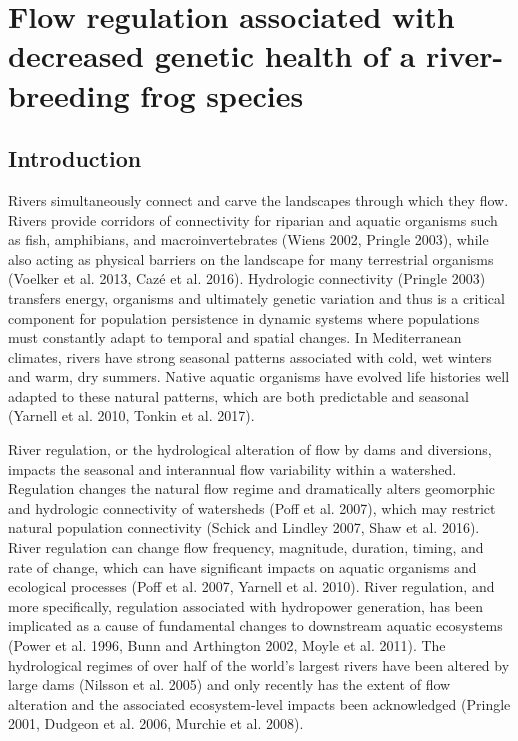 \documentclass[twoside,12pt,final]{ucthesis-CA2012} %
\begin{document}
\begin{ucmainmatter}

\pagestyle{plain}

\hypertarget{reg-health}{%
\chapter{Flow regulation associated with decreased genetic health of a
river-breeding frog species}\label{reg-health}}

\hypertarget{introduction}{%
\section{Introduction}\label{introduction}}

Rivers simultaneously connect and carve the landscapes through which
they flow. Rivers provide corridors of connectivity for riparian and
aquatic organisms such as fish, amphibians, and macroinvertebrates
(Wiens 2002, Pringle 2003), while also acting as physical barriers on
the landscape for many terrestrial organisms (Voelker et al. 2013, Cazé
et al. 2016). Hydrologic connectivity (Pringle 2003) transfers energy,
organisms and ultimately genetic variation and thus is a critical
component for population persistence in dynamic systems where
populations must constantly adapt to temporal and spatial changes. In
Mediterranean climates, rivers have strong seasonal patterns associated
with cold, wet winters and warm, dry summers. Native aquatic organisms
have evolved life histories well adapted to these natural patterns,
which are both predictable and seasonal (Yarnell et al. 2010, Tonkin et
al. 2017).

River regulation, or the hydrological alteration of flow by dams and
diversions, impacts the seasonal and interannual flow variability within
a watershed. Regulation changes the natural flow regime and dramatically
alters geomorphic and hydrologic connectivity of watersheds (Poff et al.
2007), which may restrict natural population connectivity (Schick and
Lindley 2007, Shaw et al. 2016). River regulation can change flow
frequency, magnitude, duration, timing, and rate of change, which can
have significant impacts on aquatic organisms and ecological processes
(Poff et al. 2007, Yarnell et al. 2010). River regulation, and more
specifically, regulation associated with hydropower generation, has been
implicated as a cause of fundamental changes to downstream aquatic
ecosystems (Power et al. 1996, Bunn and Arthington 2002, Moyle et al.
2011). The hydrological regimes of over half of the world's largest
rivers have been altered by large dams (Nilsson et al. 2005) and only
recently has the extent of flow alteration and the associated
ecosystem-level impacts been acknowledged (Pringle 2001, Dudgeon et al.
2006, Murchie et al. 2008).


\end{ucmainmatter}
\end{document}
